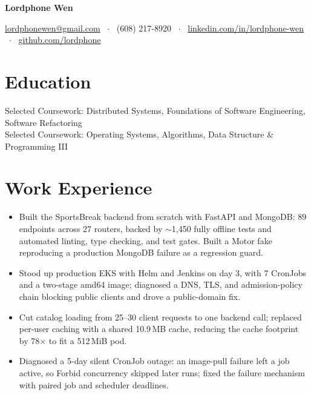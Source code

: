 \documentclass[11pt, letterpaper]{article}
\begin{document}
\noindent
{\LARGE\bfseries Lordphone Wen}%
\hfill
{}\\[5pt]
{\centering
  \href{mailto:lordphonewen@gmail.com}{lordphonewen@gmail.com} \ $\cdot$ \
  (608) 217-8920 \ $\cdot$ \
  \href{https://www.linkedin.com/in/lordphone-wen}{linkedin.com/in/lordphone-wen} \ $\cdot$ \
  \href{https://github.com/lordphone}{github.com/lordphone}\par
}

\section{Education}
Selected Coursework: Distributed Systems, Foundations of Software Engineering, Software Refactoring\\[1pt]
Selected Coursework: Operating Systems, Algorithms, Data Structure \& Programming III

\section{Work Experience}
\begin{itemize}
  \item Built the SportsBreak backend from scratch with FastAPI and MongoDB: 89 endpoints across 27 routers, backed by $\sim$1{,}450 fully offline tests and automated linting, type checking, and test gates. Built a Motor fake reproducing a production MongoDB failure as a regression guard.
  \item Stood up production EKS with Helm and Jenkins on day 3, with 7 CronJobs and a two-stage amd64 image; diagnosed a DNS, TLS, and admission-policy chain blocking public clients and drove a public-domain fix.
  \item Cut catalog loading from 25--30 client requests to one backend call; replaced per-user caching with a shared 10.9\,MB cache, reducing the cache footprint by 78$\times$ to fit a 512\,MiB pod.
  \item Diagnosed a 5-day silent CronJob outage: an image-pull failure left a job active, so Forbid concurrency skipped later runs; fixed the failure mechanism with paired job and scheduler deadlines.
\end{itemize}
\end{document}

